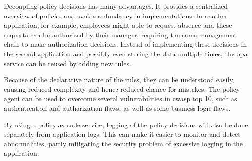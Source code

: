 Decoupling policy decisions has many advantages.
It provides a centralized overview of policies and avoids redundancy in implementations.
In another application, for example, employees might able to request absence and these requests can be authorized by their manager, requiring the same management chain to make authorization decisions.
Instead of implementing these decisions in the second application and possibly even storing the data multiple times, the \gls{opa} service can be reused by adding new rules.

Because of the declarative nature of the rules, they can be understood easily, causing reduced complexity and hence reduced chance for mistakes.
The policy agent can be used to overcome several vulnerabilities in \gls{owasp} top 10, such as authentication and authorization flaws, as well as some business logic flaws.

By using a policy as code service, logging of the policy decisions will also be done separately from application logs.
This can make it easier to monitor and detect abnormalities, partly mitigating the security problem of excessive logging in the application.
